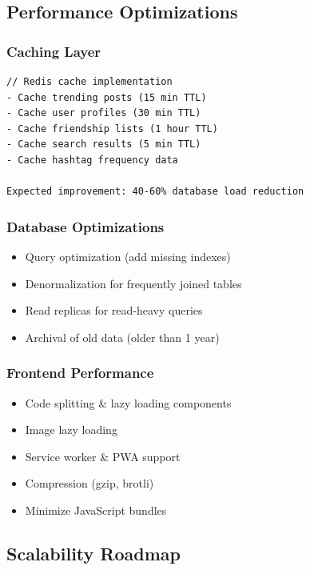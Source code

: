 \subsection{Performance Optimizations}

\subsubsection{Caching Layer}
\begin{verbatim}
// Redis cache implementation
- Cache trending posts (15 min TTL)
- Cache user profiles (30 min TTL)
- Cache friendship lists (1 hour TTL)
- Cache search results (5 min TTL)
- Cache hashtag frequency data

Expected improvement: 40-60% database load reduction
\end{verbatim}

\subsubsection{Database Optimizations}
\begin{itemize}
    \item Query optimization (add missing indexes)
    \item Denormalization for frequently joined tables
    \item Read replicas for read-heavy queries
    \item Archival of old data (older than 1 year)
\end{itemize}

\subsubsection{Frontend Performance}
\begin{itemize}
    \item Code splitting \& lazy loading components
    \item Image lazy loading
    \item Service worker \& PWA support
    \item Compression (gzip, brotli)
    \item Minimize JavaScript bundles
\end{itemize}

\subsection{Scalability Roadmap}

